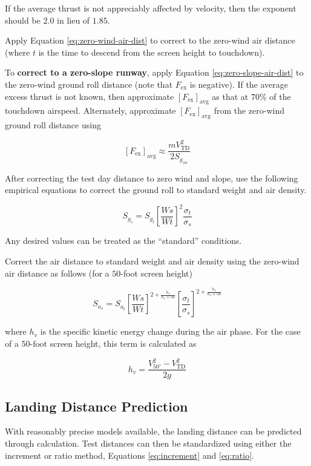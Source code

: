 \documentclass[
]{book}
\begin{document}
If the average thrust is not appreciably affected by velocity, then the exponent should be \(2.0\) in lieu of \(1.85\).

Apply Equation \eqref{eq:zero-wind-air-dist} to correct to the zero-wind air distance (where \(t\) is the time to descend from the screen height to touchdown).

To \textbf{correct to a zero-slope runway}, apply Equation \eqref{eq:zero-slope-air-dist} to the zero-wind ground roll distance (note that \(F_{\text{ex}}\) is negative).
If the average excess thrust is not known, then approximate \(\left[ F_{\text{ex}} \right]_{\text{avg}}\) as that at \(70\%\) of the touchdown airspeed.
Alternately, approximate \(\left[ F_{\text{ex}} \right]_{\text{avg}}\) from the zero-wind ground roll distance using

\[
\left[ F_{\text{ex}} \right]_{\text{avg}} \approx \frac{m V_{\mathrm{TD}}^2}{2 S_{g_{zw}}}
\label{eq:approx-fex-td-land}
\]

After correcting the test day distance to zero wind and slope, use the following empirical equations to correct the ground roll to standard weight and air density.

\[
S_{g_s} = S_{g_t} \left[ \frac{Ws}{Wt} \right]^2 \frac{\sigma_t}{\sigma_s}
\label{eq:std-gnd-roll-dist-land}
\]

Any desired values can be treated as the ``standard'' conditions.

Correct the air distance to standard weight and air density using the zero-wind air distance as follows (for a \(50\)-foot screen height)

\[
S_{a_s} = S_{a_t} \left[ \frac{Ws}{Wt} \right]^{2 + \frac{h_v}{h_v + 50}} \left[ \frac{\sigma_t}{\sigma_s} \right]^{2 + \frac{h_v}{h_v + 50}}
\label{eq:std-air-dist-land}
\]

where \(h_v\) is the specific kinetic energy change during the air phase.
For the case of a \(50\text{-foot}\) screen height, this term is calculated as

\[
h_v = \frac{V_{50'}^2 - V_{\mathrm{TD}}^2}{2g}
\label{eq:spec-ke-chg}
\]

\hypertarget{landing-distance-prediction}{%
\subsection{Landing Distance Prediction}\label{landing-distance-prediction}}

With reasonably precise models available, the landing distance can be predicted
through calculation. Test distances can then be standardized using either the
increment or ratio method, Equations \eqref{eq:increment} and \eqref{eq:ratio}.
\end{document}
